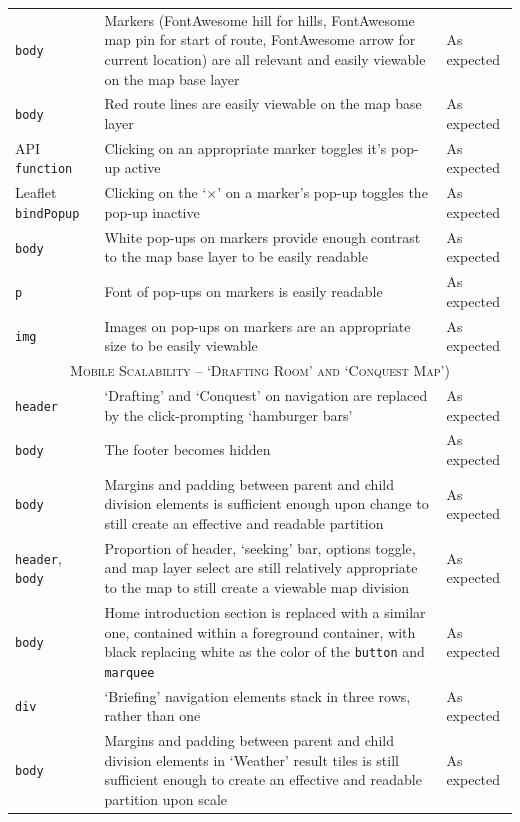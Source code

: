 \documentclass[11pt, english]{article}
\begin{document}
\begin{center}
\begin{longtable}{p{3cm}p{8cm}p{2cm}}
		\texttt{body} & Markers (FontAwesome hill for hills, FontAwesome map pin for start of route, FontAwesome arrow for current location) are all relevant and easily viewable on the map base layer & As expected\\
		\texttt{body} & Red route lines are easily viewable on the map base layer & As expected\\
		API \texttt{function} & Clicking on an appropriate marker toggles it's pop-up active & As expected\\
		Leaflet \texttt{bindPopup} & Clicking on the `$\times$' on a marker's pop-up toggles the pop-up inactive & As expected\\
		\texttt{body} & White pop-ups on markers provide enough contrast to the map base layer to be easily readable & As expected\\
		\texttt{p} & Font of pop-ups on markers is easily readable & As expected\\
		\texttt{img} & Images on pop-ups on markers are an appropriate size to be easily viewable & As expected\\
		\hline
		\multicolumn{3}{c}{\textsc{Mobile Scalability -- `Drafting Room' and `Conquest Map')}}\\
		\hline
		\texttt{header} & `Drafting' and `Conquest' on navigation are replaced by the click-prompting `hamburger bars' & As expected\\
		\texttt{body} & The footer becomes hidden & As expected\\
		\texttt{body} & Margins and padding between parent and child division elements is sufficient enough upon change to still create an effective and readable partition & As expected\\
		\texttt{header}, \texttt{body} & Proportion of header, `seeking' bar, options toggle, and map layer select are still relatively appropriate to the map to still create a viewable map division & As expected\\
		\texttt{body} & Home introduction section is replaced with a similar one, contained within a foreground container, with black replacing white as the color of the \texttt{button} and \texttt{marquee} & As expected\\
		\texttt{div} & `Briefing' navigation elements stack in three rows, rather than one & As expected\\
		\texttt{body} & Margins and padding between parent and child division elements in `Weather' result tiles is still sufficient enough to create an effective and readable partition upon scale & As expected\\

\end{longtable}
\end{center}
\end{document}
